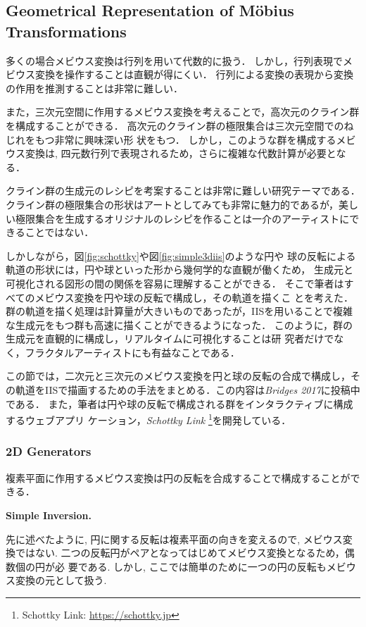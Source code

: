 \subsection{Geometrical Representation of M\"obius Transformations}

多くの場合メビウス変換は行列を用いて代数的に扱う．
しかし，行列表現でメビウス変換を操作することは直観が得にくい．
行列による変換の表現から変換の作用を推測することは非常に難しい．

また，三次元空間に作用するメビウス変換を考えることで，高次元のクライン群
を構成することができる．
高次元のクライン群の極限集合は三次元空間でのねじれをもつ非常に興味深い形
状をもつ．
しかし，このような群を構成するメビウス変換は,
四元数行列で表現されるため，さらに複雑な代数計算が必要となる．

クライン群の生成元のレシピを考案することは非常に難しい研究テーマである．
クライン群の極限集合の形状はアートとしてみても非常に魅力的であるが，美し
い極限集合を生成するオリジナルのレシピを作ることは一介のアーティストにで
きることではない．

しかしながら，図\ref{fig:schottky}や図\ref{fig:simple3diis}のような円や
球の反転による軌道の形状には，円や球といった形から幾何学的な直観が働くため，
生成元と可視化される図形の間の関係を容易に理解することができる．
そこで筆者はすべてのメビウス変換を円や球の反転で構成し，その軌道を描くこ
とを考えた．
群の軌道を描く処理は計算量が大きいものであったが，IISを用いることで複雑
な生成元をもつ群も高速に描くことができるようになった．
このように，群の生成元を直観的に構成し，リアルタイムに可視化することは研
究者だけでなく，フラクタルアーティストにも有益なことである．

この節では，二次元と三次元のメビウス変換を円と球の反転の合成で構成し，そ
の軌道をIISで描画するための手法をまとめる．この内容は\textit{Bridges
2017}に投稿中である．
また，筆者は円や球の反転で構成される群をインタラクティブに構成するウェブアプリ
ケーション，{\it Schottky Link} \footnote{Schottky Link:
\url{https://schottky.jp}}を開発している．

\subsubsection{2D Generators}

複素平面に作用するメビウス変換は円の反転を合成することで構成することがで
きる．

\noindent\textbf{Simple Inversion.}

先に述べたように, 円に関する反転は複素平面の向きを変えるので, メビウス変
換ではない.
二つの反転円がペアとなってはじめてメビウス変換となるため，偶数個の円が必
要である.
しかし, ここでは簡単のために一つの円の反転もメビウス変換の元として扱う.


